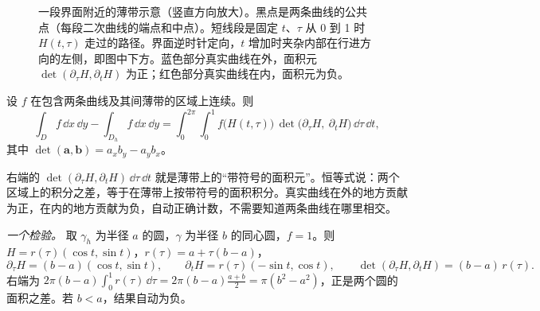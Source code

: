 \documentclass[11pt,a4paper,fontset=fandol]{ctexart}
\begin{document}
\begin{figure}[ht]
\centering
{}
\caption{一段界面附近的薄带示意（竖直方向放大）。黑点是两条曲线的公共点（每段二次曲线的端点和中点）。短线段是固定 $t$、$\tau$ 从 0 到 1 时 $H(t,\tau)$ 走过的路径。界面逆时针定向，$t$ 增加时夹杂内部在行进方向的左侧，即图中下方。蓝色部分真实曲线在外，面积元 $\det(\partial_\tau H,\partial_tH)$ 为正；红色部分真实曲线在内，面积元为负。}
\label{fig:band}
\end{figure}

\begin{proposition}[有向薄带恒等式]
\label{prop:band}
设 $f$ 在包含两条曲线及其间薄带的区域上连续。则
\begin{equation}
\label{eq:band}
\int_Df\,\dd x\,\dd y-\int_{D_h}f\,\dd x\,\dd y=\int_0^{2\pi}\!\!\int_0^1f\bigl(H(t,\tau)\bigr)\,\det\bigl(\partial_\tau H,\ \partial_tH\bigr)\,\dd\tau\,\dd t ,
\end{equation}
其中 $\det(\bm a,\bm b)=a_xb_y-a_yb_x$。
\end{proposition}

右端的 $\det(\partial_\tau H,\partial_tH)\,\dd\tau\,\dd t$ 就是薄带上的“带符号的面积元”。恒等式说：两个区域上的积分之差，等于在薄带上按带符号的面积积分。真实曲线在外的地方贡献为正，在内的地方贡献为负，自动正确计数，不需要知道两条曲线在哪里相交。

\emph{一个检验。} 取 $\gamma_h$ 为半径 $a$ 的圆，$\gamma$ 为半径 $b$ 的同心圆，$f=1$。则 $H=r(\tau)(\cos t,\sin t)$，$r(\tau)=a+\tau(b-a)$，
\[
\partial_\tau H=(b-a)(\cos t,\sin t),\qquad \partial_tH=r(\tau)(-\sin t,\cos t),\qquad \det(\partial_\tau H,\partial_tH)=(b-a)\,r(\tau) .
\]
右端为 $2\pi(b-a)\int_0^1r(\tau)\,\dd\tau=2\pi(b-a)\frac{a+b}2=\pi(b^2-a^2)$，正是两个圆的面积之差。若 $b<a$，结果自动为负。
\end{document}
